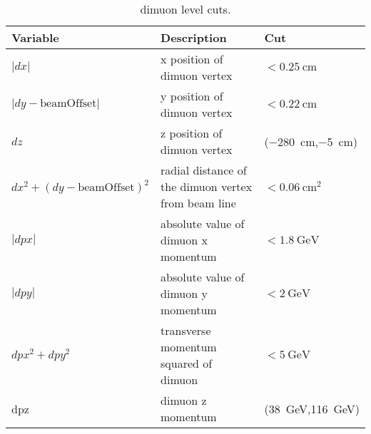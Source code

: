\documentclass[../main.tex]{subfiles}
\begin{document}
\begin{table}[ht!]
	\centering
	\caption{dimuon level cuts.}
	\label{table:dimuonCut}
	\begin{tabular}{|m{4.5cm}|m{7cm}|m{3cm}|}
		\hline
		Variable                                                                                            & Description                                                                              & Cut                            \\ \hline
		$|dx|$                                                                                              & x position of dimuon vertex                                                              & $<\SI{0.25}{\cm}$              \\ \hline
		$|dy-\mathrm{beamOffset}|$                                                                          & y position of dimuon vertex                                                              & $<\SI{0.22}{\cm}$              \\ \hline
		$dz$                                                                                                & z position of dimuon vertex                                                              & (\SI{-280}{\cm},\SI{-5}{\cm})  \\ \hline
		$dx^2+(dy-\mathrm{beamOffset})^2$                                                                   & radial distance of the dimuon vertex from beam line                                      & $<\SI{0.06}{\cm\squared}$      \\ \hline
		$|dpx|$                                                                                             & absolute value of dimuon x   momentum                                                    & $<\SI{1.8}{\GeV}$              \\ \hline
		$|dpy|$                                                                                             & absolute value of dimuon y   momentum                                                    & $<\SI{2}{\GeV}$                \\ \hline
		$dpx^2+dpy^2$                                                                                       & transverse momentum squared of   dimuon                                                  & $<\SI{5}{\GeV}$                \\ \hline
		dpz                                                                                                 & dimuon z momentum                                                                        & (\SI{38}{\GeV},\SI{116}{\GeV}) \\ \hline

\end{tabular}
\end{table}
\end{document}
